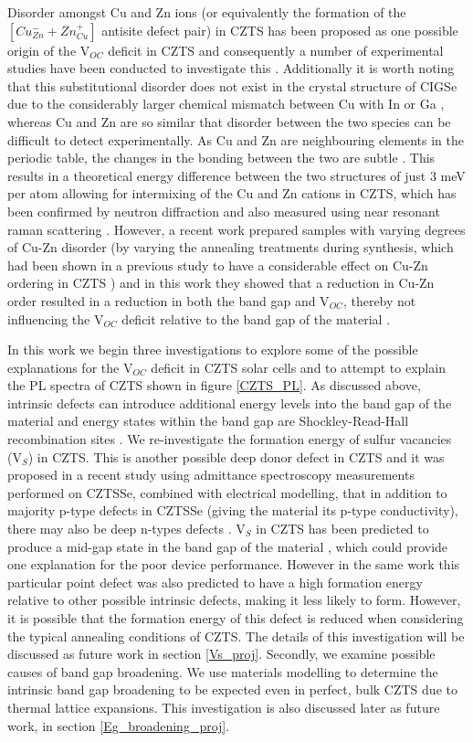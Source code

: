 Disorder amongst Cu and Zn ions (or equivalently the formation of the $[Cu_{Zn}^{-} + Zn_{Cu}^{+}]$ antisite defect pair) in CZTS has been proposed as one possible origin of the V$_{OC}$ deficit in CZTS and consequently a number of experimental studies have been conducted to investigate this \cite{Scragg, pot_fluc_4, neutron, Schorr}. Additionally it is worth noting that this substitutional disorder does not exist in the crystal structure of CIGSe due to the considerably larger chemical mismatch between Cu with In or Ga \cite{culprit}, whereas Cu and Zn are so similar that disorder between the two species can be difficult to detect experimentally. 
As Cu and Zn are neighbouring elements in the periodic table, the changes in the bonding between the two are subtle \cite{pot_fluc}. This results in a theoretical energy difference between the two structures of just 3 meV per atom \cite{Chen2009} allowing for intermixing of the Cu and Zn cations in CZTS, which has been confirmed by neutron diffraction \cite{pot_fluc_4, neutron} and also measured using near resonant raman scattering \cite{Scragg}. However, a recent work prepared samples with varying degrees of Cu-Zn disorder (by varying the annealing treatments during synthesis, which had been shown in a previous study to have a considerable effect on Cu-Zn ordering in CZTS \cite{Scragg}) and in this work they showed that a reduction in Cu-Zn order resulted in a reduction in both the band gap and V$_{OC}$, thereby not influencing the V$_{OC}$ deficit relative to the band gap of the material \cite{culprit}.

In this work we begin three investigations to explore some of the possible explanations for the V$_{OC}$ deficit in CZTS solar cells and to attempt to explain the PL spectra of CZTS shown in figure \ref{CZTS_PL}. 
As discussed above, intrinsic defects can introduce additional energy levels into the band gap of the material and energy states within the band gap are Shockley-Read-Hall recombination sites \cite{SRH}.
We re-investigate the formation energy of sulfur vacancies (V$_S$) in CZTS. This is another possible deep donor defect in CZTS and it was proposed in a recent study using admittance spectroscopy measurements performed on CZTSSe, combined with electrical modelling, that in addition to majority p-type defects in CZTSSe (giving the material its p-type conductivity), there may also be deep n-types defects \cite{CZTS_n-type}.
V$_S$ in CZTS has been predicted to produce a mid-gap state in the band gap of the material \cite{defect1}, which could provide one explanation for the poor device performance. However in the same work this particular point defect was also predicted to have a high formation energy relative to other possible intrinsic defects, making it less likely to form. However, it is possible that the formation energy of this defect is reduced when considering the typical annealing conditions of CZTS. The details of this investigation will be discussed as future work in section \ref{Vs_proj}.
Secondly, we examine possible causes of band gap broadening. We use materials modelling to determine the intrinsic band gap broadening to be expected even in perfect, bulk CZTS due to thermal lattice expansions. This investigation is also discussed later as future work, in section \ref{Eg_broadening_proj}.

